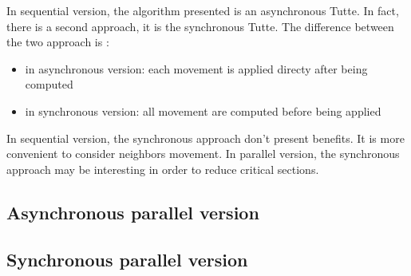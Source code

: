 
In sequential version, the algorithm presented is an asynchronous Tutte. In fact, there is a second approach, it is the synchronous Tutte. The difference between the two approach is :
\begin{itemize}
\item in asynchronous version: each movement is applied directy after being computed
\item in synchronous version: all movement are computed before being applied
\end{itemize}
In sequential version, the synchronous approach don't present benefits. It is more convenient to consider neighbors movement.
In parallel version, the synchronous approach may be interesting in order to reduce critical sections.
\subsection{Asynchronous parallel version}



\subsection{Synchronous parallel version}

